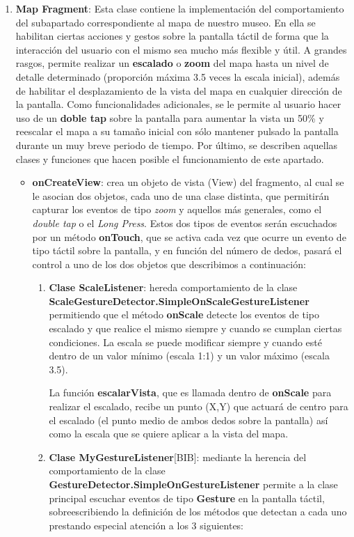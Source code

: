 \begin{enumerate}
	\item \textbf{Map Fragment}:  Esta clase contiene la implementación del comportamiento del subapartado correspondiente al mapa de nuestro museo. En ella se habilitan ciertas acciones y gestos sobre la pantalla táctil de forma que la interacción del usuario con el mismo sea mucho más flexible y útil. A grandes rasgos, permite realizar un \textbf{escalado} o \textbf{zoom} del mapa hasta un nivel de detalle determinado (proporción máxima 3.5 veces la escala inicial), además de habilitar el desplazamiento de la vista del mapa en cualquier dirección de la pantalla. Como funcionalidades adicionales, se le permite al usuario hacer uso de un \textbf{doble tap} sobre la pantalla para aumentar la vista un 50\% y reescalar el mapa a su tamaño inicial con sólo mantener pulsado la pantalla durante un muy breve periodo de tiempo. Por último, se describen aquellas clases y funciones que hacen posible el funcionamiento de este apartado.
	
	\begin{itemize}
		\item \textbf{onCreateView}: crea un objeto de vista (View) del fragmento, al cual se le asocian dos objetos, cada uno de una clase distinta, que permitirán capturar los eventos de tipo \textit{zoom} y aquellos más generales, como el \textit{double tap} o el \textit{Long Press}. Estos dos tipos de eventos serán escuchados por un método \textbf{onTouch}, que se activa cada vez que ocurre un evento de tipo táctil sobre la pantalla, y en función del número de dedos, pasará el control a uno de los dos objetos que describimos a continuación:
		\begin{enumerate}
			
			\item \textbf{Clase ScaleListener}: hereda comportamiento de la clase \textbf{ScaleGestureDetector.SimpleOnScaleGestureListener} permitiendo que el método \textbf{onScale} detecte los eventos de tipo escalado y que realice el mismo siempre y cuando se cumplan ciertas condiciones. La escala se puede modificar siempre y cuando esté dentro de un valor mínimo (escala 1:1) y un valor máximo (escala 3.5).

			La función \textbf{escalarVista}, que es llamada dentro de \textbf{onScale} para realizar el escalado, recibe un punto (X,Y) que actuará de centro para el escalado (el punto medio de ambos dedos sobre la pantalla) así como la escala que se quiere aplicar a la vista del mapa.	
			
			\item \textbf{Clase MyGestureListener}[BIB]: mediante la herencia del comportamiento de la clase \textbf{GestureDetector.SimpleOnGestureListener} permite a la clase principal escuchar eventos de tipo \textbf{Gesture} en la pantalla táctil, sobreescribiendo la definición de los métodos que detectan a cada uno prestando especial atención a los 3 siguientes:
			

\end{enumerate}
\end{itemize}
\end{enumerate}
